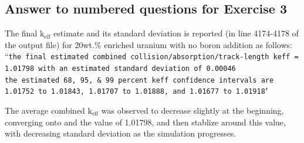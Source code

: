 \documentclass[a4paper, 12pt]{article}
\begin{document}
\subsection{Answer to numbered questions for Exercise 3}\label{Ex3Ans}
\begin{compactenum}
	\item The final $\text{k}_{\text{eff}}$ estimate and its standard deviation is reported (in line 4174-4178 of the output file) for 20wt.\% enriched uranium with no boron addition as follows:	
	\\ ``\texttt{the final estimated combined collision/absorption/track-length keff = 1.01798 with an estimated standard deviation of 0.00046}
	\\ \texttt{the estimated 68, 95, \& 99 percent keff confidence intervals are 1.01752 to 1.01843, 1.01707 to 1.01888, and 1.01677 to 1.01918}"

	The average combined $\text{k}_{\text{eff}}$ was observed to decrease slightly at the beginning, converging onto and the value of 1.01798, and then stablize around this value, with decreasing standard deviation as the simulation progresses.


\end{compactenum}
\end{document}
